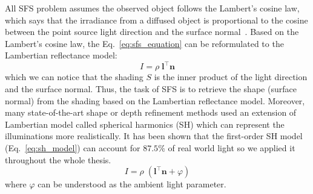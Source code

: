 All SFS problem assumes the observed object follows the Lambert's cosine law, which says that the irradiance from a diffused object is proportional to the cosine between the point source light direction and the surface normal~\cite{klett1760ih}. 
Based on the Lambert's cosine law, the Eq.~\ref{eq:sfs_equation} can be reformulated to the Lambertian reflectance model:
\begin{equation}\label{eq:lambertian_model}
    I = \rho \; \mathbf{l}^\top \mathbf{n}
\end{equation}
which we can notice that the shading $S$ is the inner product of the light direction and the surface normal.
Thus, the task of SFS is to retrieve the shape (surface normal) from the shading based on the Lambertian reflectance model.
Moreover, many state-of-the-art shape or depth refinement methods used an extension of Lambertian model called spherical harmonics (SH) \cite{basri2003lambertian, ramamoorthi2001relationship} which can represent the illuminations more realistically. 
It has been shown that the first-order SH model (Eq.~\ref{eq:sh_model}) can account for $87.5\%$ of real world light so we applied it throughout the whole thesis.
\begin{equation}\label{eq:sh_model}
    I = \rho \; (\mathbf{l}^\top \mathbf{n} + \varphi)
\end{equation}
where $\varphi$ can be understood as the ambient light parameter.


